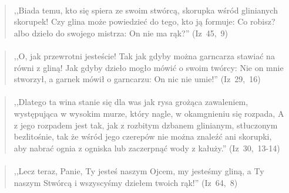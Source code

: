 \documentclass[10pt,a4paper,oneside]{article}
\begin{document}
\paragraph{}
\begin{quote}
,,Biada temu, kto się spiera ze swoim stwórcą, skorupka wśród glinianych skorupek! Czy glina może powiedzieć do tego, kto ją formuje: Co robisz? albo dzieło do swojego mistrza: On nie ma rąk?'' \mbox{(Iz 45, 9)}
\end{quote}
\paragraph{}
\begin{quote}
,,O, jak przewrotni jesteście! Tak jak gdyby można garncarza stawiać na równi z gliną! Jak gdyby dzieło mogło mówić o swoim twórcy: Nie on mnie stworzył, a garnek mówił o garncarzu: On nic nie umie!'' \mbox{(Iz 29, 16)}
\end{quote}
\paragraph{}
\begin{quote}
,,Dlatego ta wina stanie się dla was jak rysa grożąca zawaleniem, występująca w wysokim murze, który nagle, w okamgnieniu się rozpada, A z jego rozpadem jest tak, jak z rozbitym dzbanem glinianym, stłuczonym bezlitośnie, tak że wśród jego czerepów nie można znaleźć ani skorupki, aby nabrać ognia z ogniska lub zaczerpnąć wody z kałuży.'' \mbox{(Iz 30, 13-14)}
\end{quote}
\paragraph{}
\begin{quote}
,,Lecz teraz, Panie, Ty jesteś naszym Ojcem, my jesteśmy gliną, a Ty naszym Stwórcą i wszyscyśmy dziełem twoich rąk!'' \mbox{(Iz 64, 8)}
\end{quote}
\end{document}
